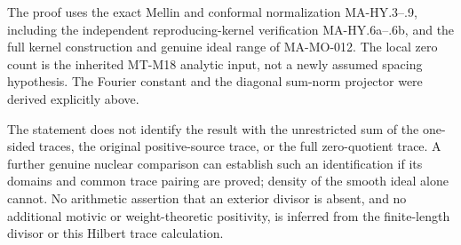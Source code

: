 The proof uses the exact Mellin and conformal normalization
MA-HY.3--.9, including the independent reproducing-kernel
verification MA-HY.6a--.6b, and the full kernel construction
and genuine ideal range of MA-MO-012.  The local zero count
is the inherited MT-M18 analytic input, not a newly assumed
spacing hypothesis.  The Fourier constant and the diagonal
sum-norm projector were derived explicitly above.

The statement does not identify the result with the
unrestricted sum of the one-sided traces, the original
positive-source trace, or the full zero-quotient trace.
A further genuine nuclear comparison can establish such
an identification if its domains and common trace pairing
are proved; density of the smooth ideal alone cannot.
No arithmetic assertion that an exterior divisor is absent,
and no additional motivic or weight-theoretic positivity,
is inferred from the finite-length divisor or this Hilbert
trace calculation.
